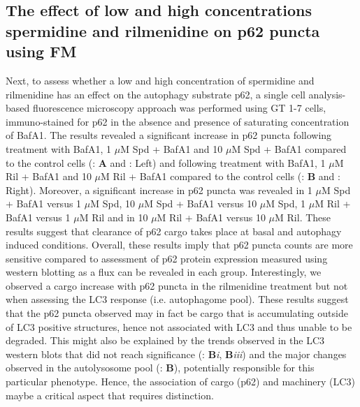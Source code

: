 \subsection{The effect of low and high concentrations spermidine and rilmenidine on p62 puncta using FM}
Next, to assess whether a low and high concentration of spermidine and rilmenidine has an effect on the autophagy substrate p62, a single cell analysis-based fluorescence microscopy approach was performed using GT 1-7 cells, immuno-stained for p62 in the absence and presence of saturating concentration of BafA1. The results revealed a significant increase in p62 puncta following treatment with BafA1, 1 $\mu$M Spd + BafA1 and 10 $\mu$M Spd + BafA1 compared to the control cells (: \textbf{A} and : Left) and following treatment  with BafA1, 1 $\mu$M Ril + BafA1  and 10 $\mu$M Ril + BafA1 compared to the control cells (: \textbf{B} and : Right). Moreover, a significant increase in p62 puncta was revealed in 1 $\mu$M Spd + BafA1 versus 1 $\mu$M Spd, 10 $\mu$M Spd + BafA1 versus 10 $\mu$M Spd, 1 $\mu$M Ril + BafA1 versus 1 $\mu$M Ril and in 10 $\mu$M Ril + BafA1 versus 10 $\mu$M Ril. These results suggest that clearance of p62 cargo takes place at basal and autophagy induced conditions. Overall, these results imply that p62 puncta counts are more sensitive compared to assessment of p62 protein expression measured using western blotting as a flux can be revealed in each group. Interestingly, we observed a cargo increase with p62 puncta in the rilmenidine treatment but not when assessing the LC3 response (i.e. autophagome pool). These results suggest that the p62 puncta observed may in fact be cargo that is accumulating outside of LC3 positive structures, hence not associated with LC3 and thus unable to be degraded. This might also be explained by the trends observed in the LC3 western blots that did not reach significance  (: \textbf{B}\textit{i}, \textbf{B}\textit{iii}) and the major changes observed in the autolysosome pool (: \textbf{B}), potentially responsible for this particular phenotype. Hence, the association of cargo (p62) and machinery (LC3) maybe a critical aspect that requires distinction.
  
